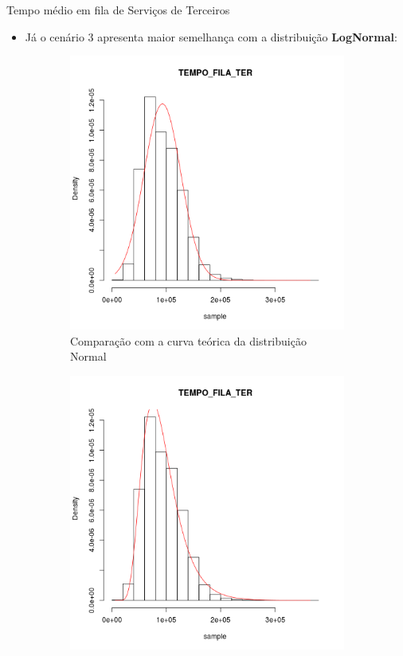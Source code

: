 \documentclass[xcolor=dvipsnames]{beamer}
\let\olditem=\item%
\renewcommand{\item}{\olditem \justifying}%
\begin{document}
\begin{frame}{Tempo médio em fila de Serviços de Terceiros}
	\begin{itemize}
		\item Já o cenário 3 apresenta maior semelhança com a distribuição \textbf{LogNormal}:
	\end{itemize}
	\begin{figure}[H]
		\centering
		\begin{subfigure}[H]{0.4\textwidth}
			\includegraphics[width=\textwidth]{img/C3-hist-norm-TEMPO_FILA_TER.png}
			\caption{Comparação com a curva teórica da distribuição Normal}
			\label{fig:C3-norm}
		\end{subfigure}
		\begin{subfigure}[H]{0.4\textwidth}
			\includegraphics[width=\textwidth]{img/C3-hist-lnorm-TEMPO_FILA_TER.png}

\end{subfigure}
\end{figure}
\end{frame}
\end{document}
